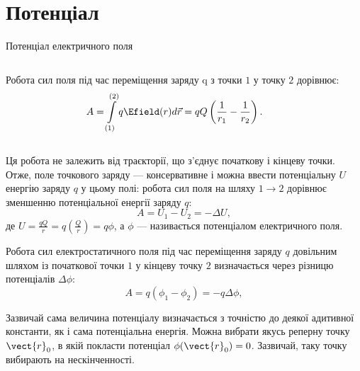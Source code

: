 \documentclass{beamer}
\begin{document}
\section{Потенціал}





\begin{frame}{Потенціал електричного поля}{}
	\begin{columns}
		\begin{column}{0.7\linewidth}\justifying
			Робота сил поля під час переміщення заряду q з точки $1$ у точку $2$
			дорівнює:
			\begin{equation*}
				A = \int\limits_{(1)}^{(2)} q\Efield(r) d\vec{r} =
				qQ\left(\frac1{r_1} - \frac1{r_2}\right).
			\end{equation*}

		\end{column}
		\begin{column}{0.3\linewidth}\centering
			
		\end{column}
	\end{columns}
	\begin{overprint}
		\begin{block}{}\justifying
			Ця \alert{робота не залежить від траєкторії}, що з'єднує початкову
			і кінцеву точки. Отже, поле точкового заряду ---
			\alert{консервативне} і можна ввести \alert{потенціальну $U$
				енергію} заряду $q$ у цьому полі: робота сил поля на шляху $1 \to
				2$ дорівнює зменшенню потенціальної енергії заряду $q$:
			\begin{equation*}
				A = U_1 - U_2 = - \Delta U,
			\end{equation*}
			де $ U = \frac{qQ}{r} = q \left( \frac{Q}{r} \right)  = q\phi$, а
			$\phi$
			--- називається \alert{потенціалом електричного поля}.
		\end{block}
		\begin{block}{}\justifying
			Робота сил електростатичного поля під час переміщення заряду $q$
			довільним шляхом із початкової точки $1$ у кінцеву точку $2$
			визначається через \alert{різницю потенціалів $\Delta\phi$}:
			\begin{equation*}
				A = q(\phi_1 - \phi_2) = - q\Delta\phi,
			\end{equation*}
		\end{block}
\begin{alertblock}{}\justifying
    Зазвичай сама величина потенціалу визначається з точністю до деякої адитивної константи, як і сама потенціальна енергія. Можна вибрати якусь реперну
    точку $\vect{r}_0$, в якій покласти потенціал $\phi(\vect{r}_0) = 0$. Зазвичай, таку точку вибирають на нескінченності.
\end{alertblock}
	\end{overprint}
\end{frame}
\end{document}
